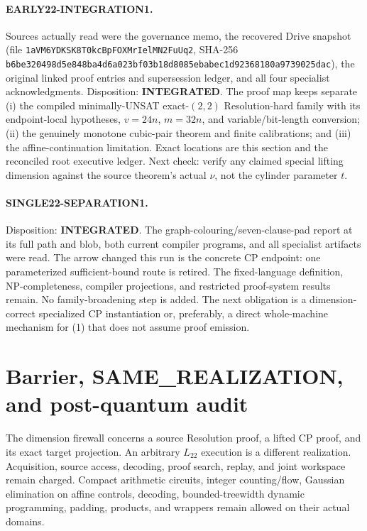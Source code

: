 \documentclass[11pt]{article}
\newcommand{\Ltwo}{L_{22}}
\begin{document}
\paragraph{EARLY22-INTEGRATION1.}
Sources actually read were the governance memo, the recovered Drive snapshot
(file \texttt{1aVM6YDKSK8T0kcBpFOXMrIelMN2FuUq2}, SHA-256
\texttt{b6be320498d5e848ba4d6a023bf03b18d8085ebabec1d92368180a9739025dac}),
the original linked proof entries and supersession ledger, and all four
specialist acknowledgments.  Disposition: \textbf{INTEGRATED}.  The proof map
keeps separate (i) the compiled minimally-UNSAT exact-\((2,2)\)
Resolution-hard family with its endpoint-local hypotheses, \(v=24n\),
\(m=32n\), and variable/bit-length conversion; (ii) the genuinely monotone
cubic-pair theorem and finite calibrations; and (iii) the affine-continuation
limitation.  Exact locations are this section and the reconciled root
executive ledger.  Next check: verify any claimed special lifting dimension
against the source theorem's actual \(\nu\), not the cylinder parameter \(t\).

\paragraph{SINGLE22-SEPARATION1.}
Disposition: \textbf{INTEGRATED}.  The graph-colouring/seven-clause-pad report
at its full path and blob, both current compiler programs, and all specialist
artifacts were read.  The arrow changed this run is the concrete CP endpoint:
one parameterized sufficient-bound route is retired.  The fixed-language
definition, NP-completeness, compiler projections, and restricted proof-system
results remain.  No family-broadening step is added.  The next obligation is a
dimension-correct specialized CP instantiation or, preferably, a direct
whole-machine mechanism for (1) that does not assume proof emission.

\section{Barrier, SAME\_REALIZATION, and post-quantum audit}
The dimension firewall concerns a source Resolution proof, a lifted CP proof,
and its exact target projection.  An arbitrary \(\Ltwo\) execution is a
different realization.  Acquisition, source access, decoding, proof search,
replay, and joint workspace remain charged.  Compact arithmetic circuits,
integer counting/flow, Gaussian elimination on affine controls, decoding,
bounded-treewidth dynamic programming, padding, products, and wrappers remain
allowed on their actual domains.
\end{document}
